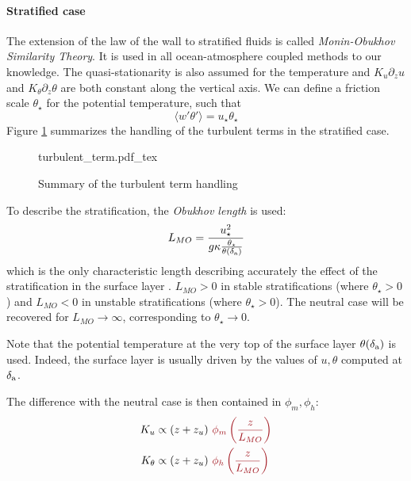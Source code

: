 \paragraph{Stratified case}
The extension of the law of the wall to stratified
fluids is called \textit{Monin-Obukhov Similarity Theory}.
It is used in all ocean-atmosphere coupled methods to our knowledge.
The quasi-stationarity is also assumed for the temperature
and $K_u \partial_z u$ and $K_\theta \partial_z \theta$
are both constant along the vertical axis.
We can define a friction scale $\theta_\star$
for the potential temperature, such that
\begin{equation}
	\langle w' \theta' \rangle = u_\star \theta_\star
\end{equation}
Figure \ref{fig:airseaSCM_turbulentTermHandling} summarizes the
handling of the turbulent terms in the stratified case.
\begin{figure}
	\centering
	{turbulent_term.pdf_tex}
	\caption{Summary of the turbulent term handling}
	\label{fig:airseaSCM_turbulentTermHandling}
\end{figure}
To describe the stratification, the \textit{Obukhov length}
is used:
\begin{equation}
	L_{MO} = \frac{u_\star^2}{g \kappa
	\frac{\theta_\star}{\theta(\delta_{\rm a})}}
\end{equation}
which is the only characteristic length describing
accurately the effect of the stratification in
the surface layer \citep{obukhov_turbulence_1946}.
$L_{MO}>0$ in stable stratifications
(where $\theta_\star>0$)
and $L_{MO}<0$ in unstable stratifications
(where $\theta_\star>0$).
The neutral case will be recovered
for $L_{MO} \rightarrow \infty$, corresponding
to $\theta_\star \rightarrow 0$.
\par
Note that the potential temperature at the very top of the surface
layer $\theta(\delta_{\rm a})$ is used. Indeed, the surface layer is
usually driven by the values of $u, \theta$
computed at $\delta_{\rm a}$.
\par
The difference with the neutral case is then contained
in  $\phi_m, \phi_h$:
\begin{equation}
\begin{aligned}
	K_u &\propto (z+z_u)~
	\emphase{\phi_m\left(\frac{z}{L_{MO}}\right)} \\
	K_\theta &\propto (z+z_u)~
	\emphase{\phi_h\left(\frac{z}{L_{MO}}\right)}
\end{aligned}
\end{equation}
